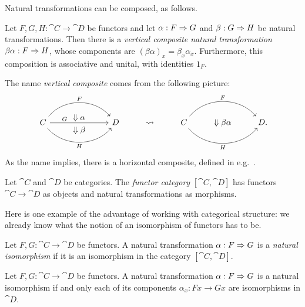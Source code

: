 Natural transformations can be composed, as follows.

\begin{prop}
  Let $F,G,H: \cat{C}\to\cat{D}$ be functors and let $\alpha: F\Rightarrow G$ and
  $\beta: G\Rightarrow H$ be natural transformations. Then there is a \emph{vertical
  composite  natural transformation} $\beta\alpha: F\Rightarrow H$, whose components are
  $(\beta\alpha)_x = \beta_x\alpha_x$. Furthermore, this composition is
  associative and unital, with identities $1_F$.
\end{prop}

The name \emph{vertical composite} comes from the following picture: \[
  \begin{tikzcd}[baseline=(current bounding box.center)]
    & \Downarrow\alpha \\[-28pt]
    C\ar[rr, "F", bend left=50]\ar[rr, "G", near start]\ar[rr, "H"', bend right=50] && D & \rightsquigarrow & C \ar[rr, "F", bend left=50]\ar[rr, "H"', bend right=50] & \Downarrow\beta\alpha & D\punctuation{.} \\[-25pt]
    & \Downarrow\beta
  \end{tikzcd}
\]
As the name implies, there is a horizontal composite, defined in
e.g.~\cite[Lemma 1.7.4]{riehl-2017}.

\begin{dfn}\label{def:functor category}
  Let $\cat{C}$ and $\cat{D}$ be categories. The \emph{functor category}
  $[\cat{C}, \cat{D}]$ has functors $\cat{C}\to\cat{D}$ as objects and natural
  transformations as morphisms.
\end{dfn}

Here is one example of the advantage of working with categorical structure: we
already know what the notion of an isomorphism of functors has to be.

\begin{dfn}\label{def:natural isomorphism}
  Let $F,G:\cat{C}\to\cat{D}$ be functors. A natural transformation $\alpha: F\Rightarrow G$ is a \emph{natural isomorphism} if
  it is an isomorphism in the category $[\cat{C}, \cat{D}]$.
\end{dfn}

\begin{prop}
  Let $F,G:\cat{C}\to\cat{D}$ be functors. A natural transformation $\alpha:
  F\Rightarrow G$ is a natural isomorphism if and only each of its components $\alpha_x:
  Fx\to Gx$ are isomorphisms in $\cat{D}$.
\end{prop}

